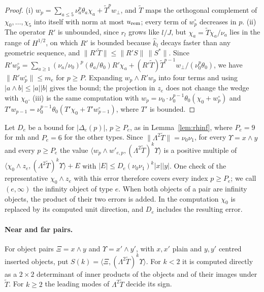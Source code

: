 \begin{proof}
(i) $w_p=\sum_{a\le5}\nu_a^p\theta_a\chi_a+\tilde T^pw_\perp$, and $\tilde T$ maps the orthogonal complement of $\chi_0,\dots,\chi_5$ into itself with norm at
most $u_{\rm rem}$; every term of $w^\circ_p$ decreases in $p$. (ii) The operator $R'$ is unbounded, since $r_l$ grows like $l/J$, but
$\chi_a=\tilde T\chi_a/\nu_a$ lies in the range of $H^{1/2}$, on which $R'$ is bounded because $\hat k_l$ decays faster than any geometric sequence, and
$\|R'\tilde T\|\le\|R'S\|\,\|S^*\|$. Since $R'w^\circ_p=\sum_{a\ge1}(\nu_a/\nu_0)^p(\theta_a/\theta_0)R'\chi_a+(R'\tilde T)\tilde T^{p-1}w_\perp/(\nu_0^p\theta_0)$,
we have $\|R'w^\circ_p\|\le m_e$ for $p\ge P$. Expanding $w_p\wedge R'w_p$ into four terms and using $|a\wedge b|\le|a||b|$ gives the bound; the projection
in $z_e$ does not change the wedge with $\chi_0$. (iii) is the same computation with $w_p=\nu_0\cdot\nu_0^{p-1}\theta_0(\chi_0+w^\circ_p)$ and
$T'w_{p-1}=\nu_0^{p-1}\theta_0(T'\chi_0+T'w^\circ_{p-1})$, where $T'$ is bounded.
\end{proof}

\noindent Let $D_e$ be a bound for $|\Delta_e(p)|$, $p\ge P_e$, as in Lemma~\ref{lem:rhinf}, where $P_e=9$ for mh and $P_e=6$ for the other types. Since
$\|\Lambda^2\tilde T\|=\nu_0\nu_1$, for every $\Upsilon=x\wedge y$ and every $p\ge P_e$ the value $\langle w_p\wedge w'_{e,p},(\Lambda^2\tilde T)^k\Upsilon\rangle$
is a positive multiple of $\langle\chi_0\wedge z_e,(\Lambda^2\tilde T)^k\Upsilon\rangle+E$ with $|E|\le D_e(\nu_0\nu_1)^k|x||y|$. One check of the representative
$\chi_0\wedge z_e$ with this error therefore covers every index $p\ge P_e$; we call $(e,\infty)$ the infinity object of type $e$. When both objects of a
pair are infinity objects, the product of their two errors is added. In the computation $\chi_0$ is replaced by its computed unit direction, and $D_e$
includes the resulting error.

\paragraph{Near and far pairs.}
For object pairs $\Xi=x\wedge y$ and $\Upsilon=x'\wedge y'$, with $x,x'$ plain and $y,y'$ centred inserted objects, put
$S(k)=\langle\Xi,(\Lambda^2\tilde T)^k\Upsilon\rangle$. For $k<2$ it is computed directly as a $2\times2$ determinant of inner products of the objects and of
their images under $\tilde T$. For $k\ge2$ the leading modes of $\Lambda^2\tilde T$ decide its sign.

